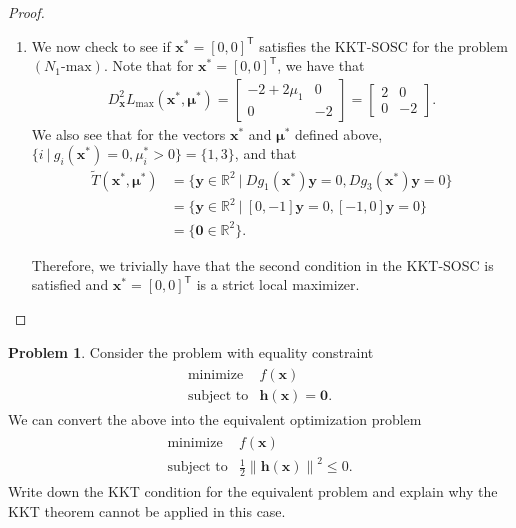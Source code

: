 \documentclass[12pt]{article}
\theoremstyle{definition}
\newtheorem{problem}{Problem}
\newcommand{\vc}[1]{\boldsymbol{#1}}
\newcommand{\norm}[1]{\left\lVert#1\right\rVert}
\newcommand{\tran}{\mathsf{T}}
\begin{document}
\begin{proof}
\begin{enumerate}
      For the problem $(N_1\text{-min})$, conditions
      ii a.\ and iii a.\ imply that $\mu_2 - \mu_3 = -\mu_3 = -4$ and $\mu_2 - \mu_1 = -\mu_1 = -2$
      or that $\mu_1 = 2$, $\mu_2 = 0$, and $\mu_3 = 4$. Therefore, the vector $\vc{x}^* = [0,0]^\tran$
      satisfies the KKT-FONC for the problem $(N_1\text{-max})$ with associated KKT multiplier $\vc{\mu}^* = [2,0,4]^\tran$.
    \item We now check to see if $\vc{x}^* = [0,0]^\tran$ satisfies the KKT-SOSC for the problem $(N_1\text{-max})$.
      Note that for $\vc{x}^*=[0,0]^\tran$, we have that
      \begin{align*}
        D_{\vc{x}}^2L_{\max}(\vc{x}^*, \vc{\mu}^*) = \begin{bmatrix}-2 + 2\mu_1 & 0 \\ 0 & -2 \end{bmatrix} = \begin{bmatrix}2 & 0 \\ 0 & -2 \end{bmatrix}.
      \end{align*}
      We also see that for the vectors $\vc{x}^*$ and $\vc{\mu}^*$ defined above, $\{i\ |\ g_i(\vc{x}^*) = 0, \mu_i^* > 0\} = \{1,3\}$, and that
      \begin{align*}
        \widetilde{T}(\vc{x}^*, \vc{\mu}^*) &= \{\vc{y}\in\mathbb{R}^2 \ |\ Dg_1(\vc{x}^*)\vc{y} = 0, Dg_3(\vc{x}^*)\vc{y} = 0\} \\
        &= \{\vc{y}\in\mathbb{R}^2 \ |\ [0, -1]\vc{y} = 0, [-1, 0]\vc{y} = 0\} \\
        &= \{\vc{0}\in\mathbb{R}^2\}.
      \end{align*}

      Therefore, we trivially have that the second condition in the KKT-SOSC is satisfied
      and $\vc{x}^{*} = [0,0]^\tran$ is a strict local maximizer.
  \end{enumerate}
\end{proof}



\begin{problem}
  Consider the problem with equality constraint
  \begin{align*}
    \begin{array}{rl}
      \text{minimize} & f(\vc{x})\\
      \text{subject to} & \vc{h}(\vc{x}) = \vc{0}.
    \end{array}
  \end{align*}
  We can convert the above into the equivalent optimization problem
  \begin{align*}
    \begin{array}{rl}
      \text{minimize} & f(\vc{x})\\
      \text{subject to} & \frac{1}{2} \norm{\vc{h}(\vc{x})}^2 \leq 0.
    \end{array}
  \end{align*}
  Write down the KKT condition for the equivalent problem and explain why the KKT
  theorem cannot be applied in this case.
\end{problem}
\end{document}

